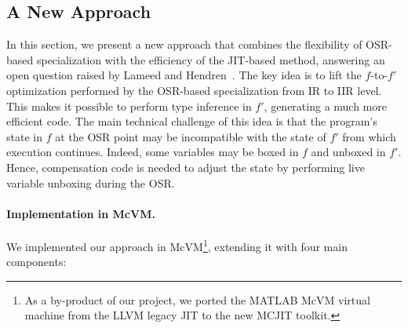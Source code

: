 
\subsection{A New Approach}
\label{ss:eval-opt-mcvm}

In this section, we present a new approach that combines the flexibility of OSR-based specialization with the efficiency of the JIT-based method, answering an open question raised by Lameed and Hendren~\cite{lameed2013feval}. The key idea is to lift the $f$-to-$f'$ optimization performed by the OSR-based specialization from IR to IIR level. This makes it possible to perform type inference in $f'$, generating a much more efficient code. The main technical challenge of this idea is that the program's state in $f$ at the OSR point may be incompatible with the state of $f'$ from which execution continues. Indeed, some variables may be boxed in $f$ and unboxed in $f'$. Hence, compensation code is needed to adjust the state by performing live variable unboxing during the OSR.



\paragraph{Implementation in McVM.}
We implemented our approach in McVM\footnote{As a by-product of our project, we ported the MATLAB McVM virtual machine from the LLVM legacy JIT to the new MCJIT toolkit.}, extending it with four main components:

